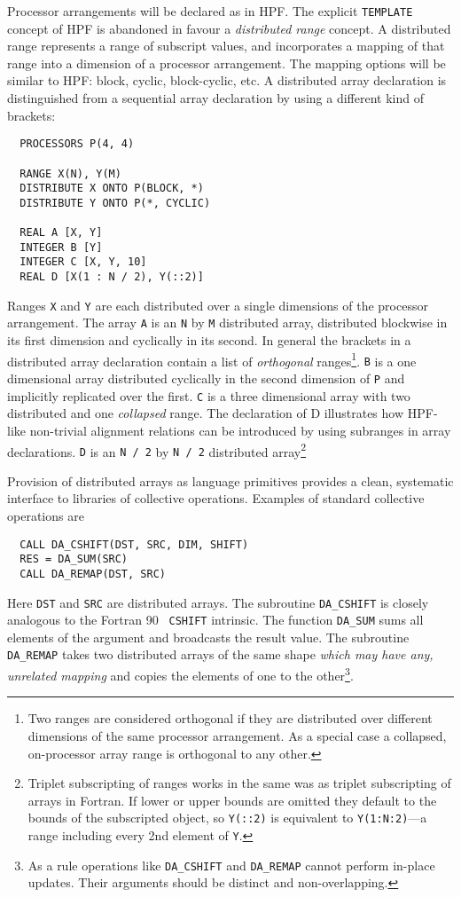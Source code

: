 Processor arrangements will be declared as in HPF.
The explicit {\tt TEMPLATE} concept
of HPF is abandoned in favour a {\em distributed range} concept.
A distributed range
represents a range of subscript values, and incorporates a mapping
of that range into a dimension of a processor arrangement.
The mapping options will be similar to HPF: block, cyclic, block-cyclic, etc.
A distributed array declaration is distinguished from a
sequential array declaration by using a
different kind of brackets:
\small
\begin{verbatim}
  PROCESSORS P(4, 4)

  RANGE X(N), Y(M)
  DISTRIBUTE X ONTO P(BLOCK, *)
  DISTRIBUTE Y ONTO P(*, CYCLIC)

  REAL A [X, Y]
  INTEGER B [Y]
  INTEGER C [X, Y, 10]
  REAL D [X(1 : N / 2), Y(::2)]
\end{verbatim}
\normalsize
Ranges {\tt X} and {\tt Y} are each distributed over a single dimensions
of the processor arrangement.
The array {\tt A} is an {\tt N} by {\tt M} distributed array,
distributed blockwise in its first dimension and cyclically in its
second.  In general the brackets in a distributed
array declaration contain a list of {\em orthogonal} ranges\footnote{Two
ranges are considered orthogonal if they are distributed over
different dimensions of the same processor arrangement.  As a special
case a collapsed, on-processor array range is orthogonal to any other.}.
{\tt B} is a one
dimensional array distributed cyclically  in the second dimension of
{\tt P} and implicitly replicated over the first.  {\tt C} is a three
dimensional array with two distributed and one {\em collapsed} range.
The declaration of D illustrates how HPF-like non-trivial alignment
relations can be introduced by using subranges in array declarations.
{\tt D} is an {\tt N / 2} by {\tt N / 2} distributed array\footnote{Triplet
subscripting of ranges works in the same was as triplet subscripting of
arrays in Fortran.  If lower or upper bounds are omitted they default
to the bounds of the subscripted object, so {\tt Y(::2)} is equivalent
to {\tt Y(1:N:2)}---a range including every 2nd element of {\tt Y}.}

Provision of distributed arrays as language primitives provides a
clean, systematic interface to libraries of collective operations.
Examples of standard collective operations are
\small
\begin{verbatim}
  CALL DA_CSHIFT(DST, SRC, DIM, SHIFT)
  RES = DA_SUM(SRC)
  CALL DA_REMAP(DST, SRC)
\end{verbatim}
\normalsize
Here {\tt DST} and {\tt SRC} are distributed arrays.  The
subroutine {\tt DA\_CSHIFT} is closely analogous to the Fortran 90 {\tt
CSHIFT} intrinsic.
The function {\tt DA\_SUM} sums all elements of the argument and broadcasts
the result value.  The subroutine {\tt DA\_REMAP} takes two distributed
arrays of the same shape {\em which may have any, unrelated mapping}
and copies the elements of one to the other\footnote{As a rule operations
like {\tt DA\_CSHIFT} and {\tt DA\_REMAP} cannot perform in-place updates.
Their arguments should be distinct and non-overlapping.}.

